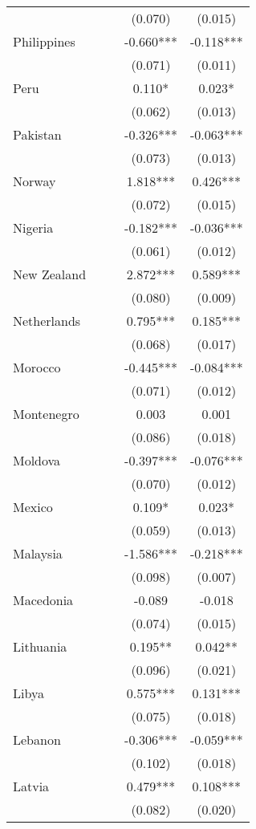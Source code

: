 \documentclass[]{article}
\begin{document}
\begin{tabular}{lcccc}
 &  &  & (0.070) & (0.015) \\
Philippines &  &  & -0.660*** & -0.118*** \\
 &  &  & (0.071) & (0.011) \\
Peru &  &  & 0.110* & 0.023* \\
 &  &  & (0.062) & (0.013) \\
Pakistan &  &  & -0.326*** & -0.063*** \\
 &  &  & (0.073) & (0.013) \\
Norway &  &  & 1.818*** & 0.426*** \\
 &  &  & (0.072) & (0.015) \\
Nigeria &  &  & -0.182*** & -0.036*** \\
 &  &  & (0.061) & (0.012) \\
New Zealand &  &  & 2.872*** & 0.589*** \\
 &  &  & (0.080) & (0.009) \\
Netherlands &  &  & 0.795*** & 0.185*** \\
 &  &  & (0.068) & (0.017) \\
Morocco &  &  & -0.445*** & -0.084*** \\
 &  &  & (0.071) & (0.012) \\
Montenegro &  &  & 0.003 & 0.001 \\
 &  &  & (0.086) & (0.018) \\
Moldova &  &  & -0.397*** & -0.076*** \\
 &  &  & (0.070) & (0.012) \\
Mexico &  &  & 0.109* & 0.023* \\
 &  &  & (0.059) & (0.013) \\
Malaysia &  &  & -1.586*** & -0.218*** \\
 &  &  & (0.098) & (0.007) \\
Macedonia &  &  & -0.089 & -0.018 \\
 &  &  & (0.074) & (0.015) \\
Lithuania &  &  & 0.195** & 0.042** \\
 &  &  & (0.096) & (0.021) \\
Libya &  &  & 0.575*** & 0.131*** \\
 &  &  & (0.075) & (0.018) \\
Lebanon &  &  & -0.306*** & -0.059*** \\
 &  &  & (0.102) & (0.018) \\
Latvia &  &  & 0.479*** & 0.108*** \\
 &  &  & (0.082) & (0.020) \\

\end{tabular}
\end{document}
